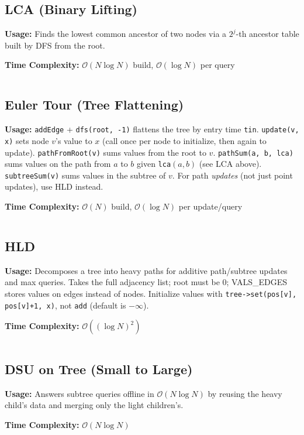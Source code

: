   \subsection{LCA (Binary Lifting)}
    \par \textbf{Usage:} Finds the lowest common ancestor of two nodes via a $2^j$-th ancestor table built by DFS from the root.
    \par \textbf{Time Complexity:} $\mathcal{O}(N \log N)$ build, $\mathcal{O}(\log N)$ per query
    \inputminted{cpp}{library/graphs/lca.cpp}
  \subsection{Euler Tour (Tree Flattening)}
    \par \textbf{Usage:} \texttt{addEdge} + \texttt{dfs(root, -1)} flattens the tree by entry time \texttt{tin}. \texttt{update(v, x)} sets node $v$'s value to $x$ (call once per node to initialize, then again to update). \texttt{pathFromRoot(v)} sums values from the root to $v$. \texttt{pathSum(a, b, lca)} sums values on the path from $a$ to $b$ given \texttt{lca}$(a,b)$ (see LCA above). \texttt{subtreeSum(v)} sums values in the subtree of $v$. For path \emph{updates} (not just point updates), use HLD instead.
    \par \textbf{Time Complexity:} $\mathcal{O}(N)$ build, $\mathcal{O}(\log N)$ per update/query
    \inputminted{cpp}{library/graphs/euler_tour.cpp}
  \subsection{HLD}
    \par \textbf{Usage:} Decomposes a tree into heavy paths for additive path/subtree updates and max queries. Takes the full adjacency list; root must be 0; VALS\_EDGES stores values on edges instead of nodes. Initialize values with \texttt{tree->set(pos[v], pos[v]+1, x)}, not \texttt{add} (default is $-\infty$).
    \par \textbf{Time Complexity:} $\mathcal{O}((\log N)^2)$
    \inputminted{cpp}{library/graphs/hld.cpp}

  \subsection{DSU on Tree (Small to Large)}
    \par \textbf{Usage:} Answers subtree queries offline in $\mathcal{O}(N \log N)$ by reusing the heavy child's data and merging only the light children's.
    \par \textbf{Time Complexity:} $\mathcal{O}(N \log N)$
    \inputminted{cpp}{library/graphs/dsu_on_tree.cpp}

